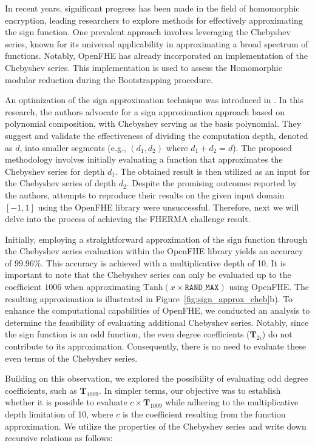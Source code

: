 \documentclass[journal=tosc,final]{iacrtrans}
\begin{document}
In recent years, significant progress has been made in the field of homomorphic encryption, leading researchers to explore methods for effectively approximating the sign function. One prevalent approach involves leveraging the Chebyshev series, known for its universal applicability in approximating a broad spectrum of functions. Notably, OpenFHE has already incorporated an implementation of the Chebyshev series. This implementation is used to assess the Homomorphic modular reduction during the Bootstrapping procedure.

An optimization of the sign approximation technique was introduced in \cite{Sign_approx_comp_poly}. In this research, the authors advocate for a sign approximation approach based on polynomial composition, with Chebyshev serving as the basis polynomial. They suggest and validate the effectiveness of dividing the computation depth, denoted as $d$, into smaller segments (e.g., $(d_1,d_2)$ where $d_1+d_2=d$). The proposed methodology involves initially evaluating a function that approximates the Chebyshev series for depth $d_1$. The obtained result is then utilized as an input for the Chebyshev series of depth $d_2$. Despite the promising outcomes reported by the authors, attempts to reproduce their results on the given input domain $[-1,1]$ using the OpenFHE library were unsuccessful. Therefore, next we will delve into the process of achieving the FHERMA challenge result. 

Initially, employing a straightforward approximation of the sign function through the Chebyshev series evaluation within the OpenFHE library yields an accuracy of $99.96\%$. This accuracy is achieved with a multiplicative depth of 10. It is important to note that the Chebyshev series can only be evaluated up to the coefficient $1006$ when approximating $\text{Tanh}(x\times\texttt{RAND\_MAX})$ using OpenFHE. The resulting approximation is illustrated in Figure~\ref{fig:sign_approx_cheb}b). To enhance the computational capabilities of OpenFHE, we conducted an analysis to determine the feasibility of evaluating additional Chebyshev series. Notably, since the sign function is an odd function, the even degree coefficients ($\textbf{T}_{2i}$) do not contribute to its approximation. Consequently, there is no need to evaluate these even terms of the Chebyshev series.

Building on this observation, we explored the possibility of evaluating odd degree coefficients, such as $\textbf{T}_{1009}$. In simpler terms, our objective was to establish whether it is possible to evaluate $c \times\textbf{T}_{1009}$ while adhering to the multiplicative depth limitation of 10, where $c$ is the coefficient resulting from the function approximation. We utilize the properties of the Chebyshev series and write down recursive relations as follows:
\end{document}

